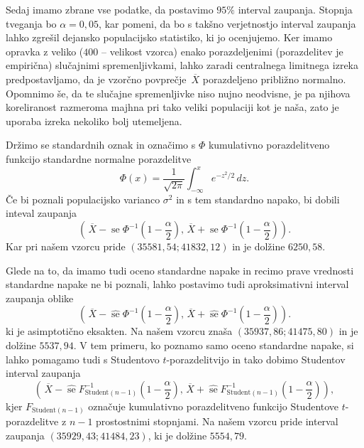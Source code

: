 \documentclass[a4paper,11pt]{article}
\newcommand{\olsi}[1]{\,\overline{\!{#1}}} %
\newcommand{\inv}{^{-1}}
\DeclareMathOperator{\se}{se}
\begin{document}
Sedaj imamo zbrane vse podatke, da postavimo $95\%$ interval zaupanja. Stopnja tveganja bo $\alpha = 0,05$, kar pomeni, da bo s takšno verjetnostjo interval zaupanja lahko zgrešil dejansko populacijsko statistiko, ki jo ocenjujemo. Ker imamo opravka z veliko ($400$ -- velikost vzorca) enako porazdeljenimi (porazdelitev je empirična) slučajnimi spremenljivkami, lahko zaradi centralnega limitnega izreka predpostavljamo, da je vzorčno povprečje $\olsi{X}$ porazdeljeno približno normalno. Opomnimo še, da te slučajne spremenljivke niso nujno neodvisne, je pa njihova koreliranost razmeroma majhna pri tako veliki populaciji kot je naša, zato je uporaba izreka nekoliko bolj utemeljena. 

Držimo se standardnih oznak in označimo s $\Phi$ kumulativno porazdelitveno funkcijo standardne normalne porazdelitve
\[
    \Phi(x) = \frac{1}{\sqrt{2 \pi}} \int_{-\infty}^{x} e^{-z^2/2}\,dz.
\]
Če bi poznali populacijsko varianco $\sigma^2$ in s tem standardno napako, bi dobili inteval zaupanja   
\begin{equation}
    \label{normalni IZ}    
    \left(\olsi{X} - \se \Phi\inv\left(1 - \frac{\alpha}{2}\right), 
    \olsi{X} + \se \Phi\inv\left(1 - \frac{\alpha}{2}\right)\right).
\end{equation}
Kar pri našem vzorcu pride $\left( 35581,54; 41832,12 \right)$ in je dolžine $6250,58$.

Glede na to, da imamo tudi oceno standardne napake in recimo prave vrednosti standardne napake ne bi poznali, lahko postavimo tudi aproksimativni interval zaupanja oblike
\begin{equation}
    \label{aproksimativni IZ}
    \left(\olsi{X} - \hat{\se} \Phi\inv\left(1 - \frac{\alpha}{2}\right), 
    \olsi{X} + \hat{\se} \Phi\inv\left(1 - \frac{\alpha}{2}\right)\right).
\end{equation}
ki je asimptotično eksakten. Na našem vzorcu znaša $\left( 35937,86; 41475,80\right)$ in je dolžine $5537,94$. 
V tem primeru, ko poznamo samo oceno standardne napake, si lahko pomagamo tudi s Studentovo $t$-porazdelitvijo in tako dobimo Studentov interval zaupanja
\begin{equation}
    \label{studentov IZ}
    \left(\olsi{X} - \hat{\se} F_{\text{Student}(n-1)}\inv\left(1 - \frac{\alpha}{2}\right), 
    \olsi{X} + \hat{\se} F_{\text{Student}(n-1)}\inv\left(1 - \frac{\alpha}{2}\right)\right),
\end{equation}
kjer $F_{\text{Student}(n-1)}$ označuje kumulativno porazdelitveno funkcijo Studentove $t$-porazdelitve z $n-1$ prostostnimi stopnjami. Na našem vzorcu pride interval zaupanja $\left(35929,43; 41484,23\right)$, ki je dolžine $5554,79$.
\\
\end{document}

